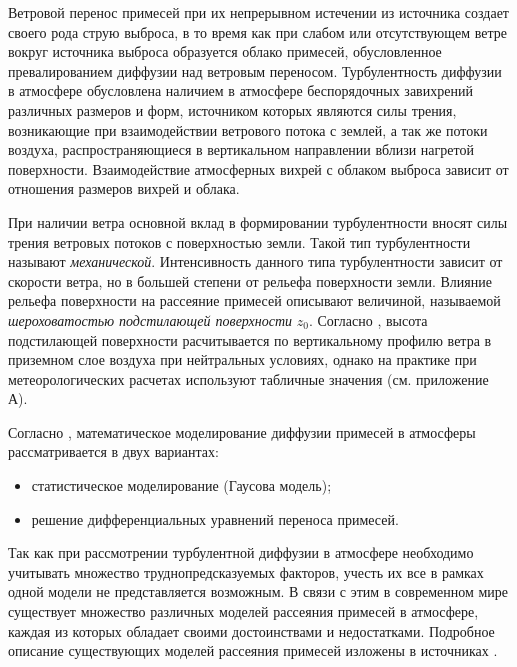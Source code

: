 Ветровой перенос примесей при их непрерывном истечении из источника создает своего рода струю выброса, в то время как 
при слабом или отсутствующем ветре вокруг источника выброса образуется облако примесей, обусловленное превалированием 
диффузии над ветровым переносом. Турбулентность диффузии в атмосфере обусловлена наличием в атмосфере беспорядочных 
завихрений различных размеров и форм, источником которых являются силы трения, возникающие при взаимодействии ветрового 
потока с землей, а так же потоки воздуха, распространяющиеся в вертикальном направлении вблизи нагретой поверхности. 
Взаимодействие атмосферных вихрей с облаком выброса зависит от отношения размеров вихрей и облака. \cite{gusev_bio}

При наличии ветра основной вклад в формировании турбулентности вносят силы трения ветровых потоков с поверхностью земли. 
Такой тип турбулентности называют \textit{механической}. Интенсивность данного типа турбулентности зависит от скорости 
ветра, но в большей степени от рельефа поверхности земли. Влияние рельефа поверхности на рассеяние примесей описывают 
величиной, называемой \textit{шероховатостью подстилающей поверхности} $z_0$. Согласно \cite{setton, bizova_meteor, 
berlyand}, высота подстилающей поверхности расчитывается по вертикальному профилю ветра в приземном слое воздуха при 
нейтральных условиях, однако на практике при метеорологических расчетах используют табличные значения \cite{mlyavaya} 
(см. приложение А).

Согласно \cite{gusev_bio}, математическое моделирование диффузии примесей в атмосферы рассматривается в двух вариантах: 
\begin{itemize}
	\item статистическое моделирование (Гаусова модель);
	\item решение дифференциальных уравнений переноса примесей.
\end{itemize}

Так как при рассмотрении турбулентной диффузии в атмосфере необходимо учитывать множество труднопредсказуемых факторов, 
учесть их все в рамках одной модели не представляется возможным. В связи с этим в современном мире существует множество 
различных моделей рассеяния примесей в атмосфере, каждая из которых обладает своими достоинствами и недостатками. 
Подробное описание существующих моделей рассеяния примесей изложены в источниках \cite{setton, bizova_meteor, berlyand, 
radio_transfer, disper_atmos, met_radio, general_exposure, laihtman, bizova_scatter, disper_models}.

